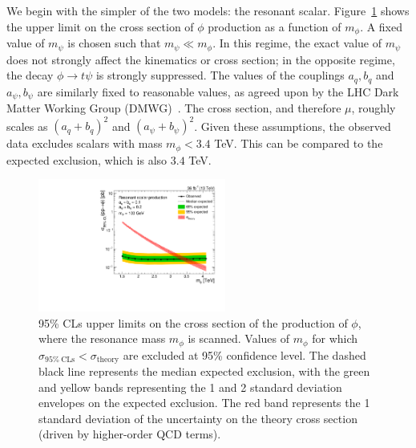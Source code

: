 We begin with the simpler of the two models: the resonant scalar. 
Figure~\ref{fig:mt:res_obs} shows the upper limit on the cross section of $\phi$ production as a function of $m_\phi$.
A fixed value of $m_\psi$ is chosen such that $m_\psi \ll m_\phi$. 
In this regime, the exact value of $m_\psi$ does not strongly affect the kinematics or cross section; in the opposite regime, the decay $\phi\rightarrow t\psi$ is strongly suppressed. 
The values of the couplings $a_q,b_q$ and $a_\psi,b_\psi$ are similarly fixed to reasonable values, as agreed upon by the LHC Dark Matter Working Group (DMWG)~\cite{lhcdmwg}.
The cross section, and therefore $\mu$, roughly scales as $(a_q+b_q)^2$ and $(a_\psi+b_\psi)^2$. 
Given these assumptions, the observed data excludes scalars with mass $m_\phi < 3.4$ TeV.
This can be compared to the expected exclusion, which is also $3.4$ TeV.

\begin{figure}[]
    \begin{center}
        \includegraphics[width=0.55\textwidth]{figures/monotop/results/res_obs_limit.pdf}
        \caption{95\% CLs upper limits on the cross section of the production of $\phi$, where the resonance mass $m_\phi$ is scanned.
                 Values of $m_\phi$ for which $\sigma_{95\%~\mathrm{CLs}} < \sigma_\mathrm{theory}$ are excluded at 95\% confidence level.
                 The dashed black line represents the median expected exclusion, with the green and yellow bands representing the 1 and 2 standard deviation envelopes on the expected exclusion.
                 The red band represents the 1 standard deviation of the uncertainty on the theory cross section (driven by higher-order QCD terms). }
        \label{fig:mt:res_obs}
    \end{center}
\end{figure}

